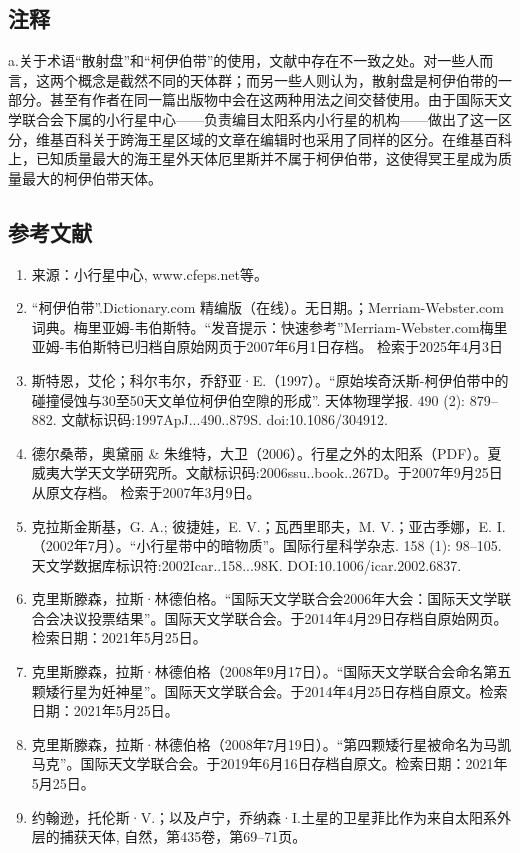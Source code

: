 \subsection{注释}
a.关于术语“散射盘”和“柯伊伯带”的使用，文献中存在不一致之处。对一些人而言，这两个概念是截然不同的天体群；而另一些人则认为，散射盘是柯伊伯带的一部分。甚至有作者在同一篇出版物中会在这两种用法之间交替使用。由于国际天文学联合会下属的小行星中心——负责编目太阳系内小行星的机构——做出了这一区分，维基百科关于跨海王星区域的文章在编辑时也采用了同样的区分。在维基百科上，已知质量最大的海王星外天体厄里斯并不属于柯伊伯带，这使得冥王星成为质量最大的柯伊伯带天体。
\subsection{参考文献}
\begin{enumerate}
\item 来源：小行星中心, www.cfeps.net等。
\item “柯伊伯带”.Dictionary.com 精编版（在线）。无日期。；Merriam-Webster.com 词典。梅里亚姆-韦伯斯特。“发音提示：快速参考”Merriam-Webster.com梅里亚姆-韦伯斯特已归档自原始网页于2007年6月1日存档。 检索于2025年4月3日
\item 斯特恩，艾伦；科尔韦尔，乔舒亚·E.（1997）。“原始埃奇沃斯-柯伊伯带中的碰撞侵蚀与30至50天文单位柯伊伯空隙的形成”. 天体物理学报. 490 (2): 879–882. 文献标识码:1997ApJ...490..879S. doi:10.1086/304912.
\item 德尔桑蒂，奥黛丽 & 朱维特，大卫（2006）。行星之外的太阳系（PDF）。夏威夷大学天文学研究所。文献标识码:2006ssu..book..267D。于2007年9月25日从原文存档。 检索于2007年3月9日。
\item 克拉斯金斯基，G. A.; 彼捷娃，E. V.；瓦西里耶夫，M. V.；亚古季娜，E. I. （2002年7月）。“小行星带中的暗物质”。国际行星科学杂志. 158 (1): 98–105. 天文学数据库标识符:2002Icar..158...98K. DOI:10.1006/icar.2002.6837.
\item 克里斯滕森，拉斯·林德伯格。“国际天文学联合会2006年大会：国际天文学联合会决议投票结果”。国际天文学联合会。于2014年4月29日存档自原始网页。检索日期：2021年5月25日。
\item 克里斯滕森，拉斯·林德伯格（2008年9月17日）。“国际天文学联合会命名第五颗矮行星为妊神星”。国际天文学联合会。于2014年4月25日存档自原文。检索日期：2021年5月25日。
\item 克里斯滕森，拉斯·林德伯格（2008年7月19日）。“第四颗矮行星被命名为马凯马克”。国际天文学联合会。于2019年6月16日存档自原文。检索日期：2021年5月25日。
\item 约翰逊，托伦斯·V.；以及卢宁，乔纳森·I.土星的卫星菲比作为来自太阳系外层的捕获天体, 自然，第435卷，第69–71页。

\end{enumerate}
